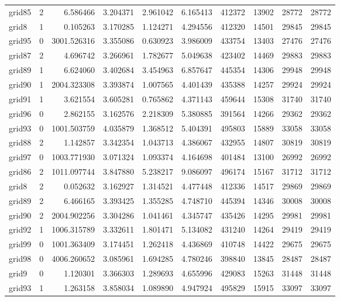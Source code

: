 \begin{longtable}{|l|r|r|r|r|r|r|r|r|r|}
grid85 & 2 & 6.586466 & 3.204371 & 2.961042 & 6.165413 & 412372 & 13902 & 28772 & 28772 \\
grid8 & 1 & 0.105263 & 3.170285 & 1.124271 & 4.294556 & 412320 & 14501 & 29845 & 29845 \\
grid95 & 0 & 3001.526316 & 3.355086 & 0.630923 & 3.986009 & 433754 & 13403 & 27476 & 27476 \\
grid87 & 2 & 4.696742 & 3.266961 & 1.782677 & 5.049638 & 423402 & 14469 & 29883 & 29883 \\
grid89 & 1 & 6.624060 & 3.402684 & 3.454963 & 6.857647 & 445354 & 14306 & 29948 & 29948 \\
grid90 & 1 & 2004.323308 & 3.393874 & 1.007565 & 4.401439 & 435388 & 14257 & 29924 & 29924 \\
grid91 & 1 & 3.621554 & 3.605281 & 0.765862 & 4.371143 & 459644 & 15308 & 31740 & 31740 \\
grid96 & 0 & 2.862155 & 3.162576 & 2.218309 & 5.380885 & 391564 & 14266 & 29362 & 29362 \\
grid93 & 0 & 1001.503759 & 4.035879 & 1.368512 & 5.404391 & 495803 & 15889 & 33058 & 33058 \\
grid88 & 2 & 1.142857 & 3.342354 & 1.043713 & 4.386067 & 432955 & 14807 & 30819 & 30819 \\
grid97 & 0 & 1003.771930 & 3.071324 & 1.093374 & 4.164698 & 401484 & 13100 & 26992 & 26992 \\
grid86 & 2 & 1011.097744 & 3.847880 & 5.238217 & 9.086097 & 496174 & 15167 & 31712 & 31712 \\
grid8 & 2 & 0.052632 & 3.162927 & 1.314521 & 4.477448 & 412336 & 14517 & 29869 & 29869 \\
grid89 & 2 & 6.466165 & 3.393425 & 1.355285 & 4.748710 & 445394 & 14346 & 30008 & 30008 \\
grid90 & 2 & 2004.902256 & 3.304286 & 1.041461 & 4.345747 & 435426 & 14295 & 29981 & 29981 \\
grid92 & 1 & 1006.315789 & 3.332611 & 1.801471 & 5.134082 & 431240 & 14264 & 29419 & 29419 \\
grid99 & 0 & 1001.363409 & 3.174451 & 1.262418 & 4.436869 & 410748 & 14422 & 29675 & 29675 \\
grid98 & 0 & 4006.260652 & 3.085961 & 1.694285 & 4.780246 & 398840 & 13845 & 28487 & 28487 \\
grid9 & 0 & 1.120301 & 3.366303 & 1.289693 & 4.655996 & 429083 & 15263 & 31448 & 31448 \\
grid93 & 1 & 1.263158 & 3.858034 & 1.089890 & 4.947924 & 495829 & 15915 & 33097 & 33097 \\

\end{longtable}
